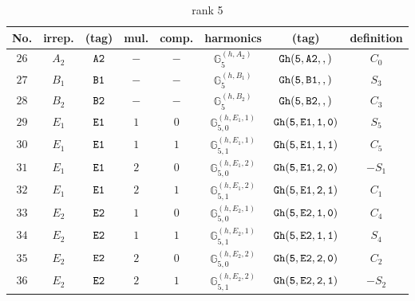\documentclass[fleqn,8pt]{jsarticle}
\begin{document}
\begin{table}[ht!]
\begin{center}
\caption{rank 5}
\renewcommand{\arraystretch}{1.3}
\begin{tabular}{cccccccc} \hline \hline
No. & irrep. & (tag) & mul. & comp. & harmonics & (tag) & definition \\ \hline
$ 26 $ & $ A_{2} $ & $ {\tt A2} $ & $ - $ & $ - $ & $ \mathbb{G}_{5}^{(h,A_{2})} $ & $ {\tt Gh(5,A2,,)} $ & $ C_{0} $ \\
$ 27 $ & $ B_{1} $ & $ {\tt B1} $ & $ - $ & $ - $ & $ \mathbb{G}_{5}^{(h,B_{1})} $ & $ {\tt Gh(5,B1,,)} $ & $ S_{3} $ \\
$ 28 $ & $ B_{2} $ & $ {\tt B2} $ & $ - $ & $ - $ & $ \mathbb{G}_{5}^{(h,B_{2})} $ & $ {\tt Gh(5,B2,,)} $ & $ C_{3} $ \\
$ 29 $ & $ E_{1} $ & $ {\tt E1} $ & $ 1 $ & $ 0 $ & $ \mathbb{G}_{5,0}^{(h,E_{1},1)} $ & $ {\tt Gh(5,E1,1,0)} $ & $ S_{5} $ \\
$ 30 $ & $ E_{1} $ & $ {\tt E1} $ & $ 1 $ & $ 1 $ & $ \mathbb{G}_{5,1}^{(h,E_{1},1)} $ & $ {\tt Gh(5,E1,1,1)} $ & $ C_{5} $ \\
$ 31 $ & $ E_{1} $ & $ {\tt E1} $ & $ 2 $ & $ 0 $ & $ \mathbb{G}_{5,0}^{(h,E_{1},2)} $ & $ {\tt Gh(5,E1,2,0)} $ & $ - S_{1} $ \\
$ 32 $ & $ E_{1} $ & $ {\tt E1} $ & $ 2 $ & $ 1 $ & $ \mathbb{G}_{5,1}^{(h,E_{1},2)} $ & $ {\tt Gh(5,E1,2,1)} $ & $ C_{1} $ \\
$ 33 $ & $ E_{2} $ & $ {\tt E2} $ & $ 1 $ & $ 0 $ & $ \mathbb{G}_{5,0}^{(h,E_{2},1)} $ & $ {\tt Gh(5,E2,1,0)} $ & $ C_{4} $ \\
$ 34 $ & $ E_{2} $ & $ {\tt E2} $ & $ 1 $ & $ 1 $ & $ \mathbb{G}_{5,1}^{(h,E_{2},1)} $ & $ {\tt Gh(5,E2,1,1)} $ & $ S_{4} $ \\
$ 35 $ & $ E_{2} $ & $ {\tt E2} $ & $ 2 $ & $ 0 $ & $ \mathbb{G}_{5,0}^{(h,E_{2},2)} $ & $ {\tt Gh(5,E2,2,0)} $ & $ C_{2} $ \\
$ 36 $ & $ E_{2} $ & $ {\tt E2} $ & $ 2 $ & $ 1 $ & $ \mathbb{G}_{5,1}^{(h,E_{2},2)} $ & $ {\tt Gh(5,E2,2,1)} $ & $ - S_{2} $ \\
 \hline \hline
\end{tabular}
\end{center}
\end{table}
\end{document}
